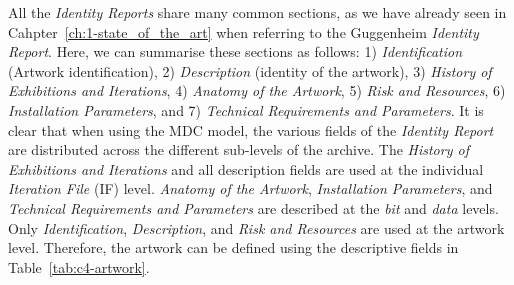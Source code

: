 All the \textit{Identity Reports} share many common sections, as we have already seen in Cahpter~\ref{ch:1-state_of_the_art} when referring to the Guggenheim \textit{Identity Report}. Here, we can summarise these sections as follows: 1) \textit{Identification} (Artwork identification), 2) \textit{Description} (identity of the artwork), 3) \textit{History of Exhibitions and Iterations}, 4) \textit{Anatomy of the Artwork}, 5) \textit{Risk and Resources}, 6) \textit{Installation Parameters}, and 7) \textit{Technical Requirements and Parameters}. It is clear that when using the MDC model, the various fields of the \textit{Identity Report} are distributed across the different sub-levels of the archive. The \textit{History of Exhibitions and Iterations} and all description fields are used at the individual \textit{Iteration File} (IF) level. \textit{Anatomy of the Artwork}, \textit{Installation Parameters}, and \textit{Technical Requirements and Parameters} are described at the \textit{bit} and \textit{data} levels. Only \textit{Identification}, \textit{Description}, and \textit{Risk and Resources} are used at the artwork level. Therefore, the artwork can be defined using the descriptive fields in Table~\ref{tab:c4-artwork}.


